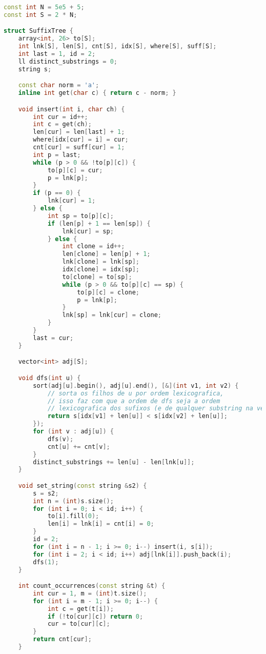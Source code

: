 \documentclass[10pt, a4paper, oneside]{book}
\begin{document}
\begin{lstlisting}[language=C++]
const int N = 5e5 + 5;
const int S = 2 * N;

struct SuffixTree {
    array<int, 26> to[S];
    int lnk[S], len[S], cnt[S], idx[S], where[S], suff[S];
    int last = 1, id = 2;
    ll distinct_substrings = 0;
    string s;

    const char norm = 'a';
    inline int get(char c) { return c - norm; }

    void insert(int i, char ch) {
        int cur = id++;
        int c = get(ch);
        len[cur] = len[last] + 1;
        where[idx[cur] = i] = cur;
        cnt[cur] = suff[cur] = 1;
        int p = last;
        while (p > 0 && !to[p][c]) {
            to[p][c] = cur;
            p = lnk[p];
        }
        if (p == 0) {
            lnk[cur] = 1;
        } else {
            int sp = to[p][c];
            if (len[p] + 1 == len[sp]) {
                lnk[cur] = sp;
            } else {
                int clone = id++;
                len[clone] = len[p] + 1;
                lnk[clone] = lnk[sp];
                idx[clone] = idx[sp];
                to[clone] = to[sp];
                while (p > 0 && to[p][c] == sp) {
                    to[p][c] = clone;
                    p = lnk[p];
                }
                lnk[sp] = lnk[cur] = clone;
            }
        }
        last = cur;
    }

    vector<int> adj[S];

    void dfs(int u) {
        sort(adj[u].begin(), adj[u].end(), [&](int v1, int v2) {
            // sorta os filhos de u por ordem lexicografica,
            // isso faz com que a ordem de dfs seja a ordem
            // lexicografica dos sufixos (e de qualquer substring na verdade)
            return s[idx[v1] + len[u]] < s[idx[v2] + len[u]];
        });
        for (int v : adj[u]) {
            dfs(v);
            cnt[u] += cnt[v];
        }
        distinct_substrings += len[u] - len[lnk[u]];
    }

    void set_string(const string &s2) {
        s = s2;
        int n = (int)s.size();
        for (int i = 0; i < id; i++) {
            to[i].fill(0);
            len[i] = lnk[i] = cnt[i] = 0;
        }
        id = 2;
        for (int i = n - 1; i >= 0; i--) insert(i, s[i]);
        for (int i = 2; i < id; i++) adj[lnk[i]].push_back(i);
        dfs(1);
    }

    int count_occurrences(const string &t) {
        int cur = 1, m = (int)t.size();
        for (int i = m - 1; i >= 0; i--) {
            int c = get(t[i]);
            if (!to[cur][c]) return 0;
            cur = to[cur][c];
        }
        return cnt[cur];
    }


\end{lstlisting}
\end{document}
